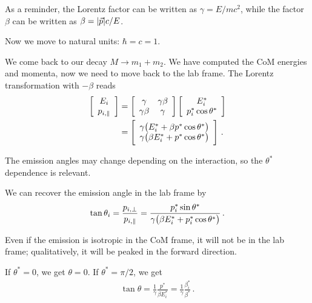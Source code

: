 \documentclass[main.tex]{subfiles}
\begin{document}

As a reminder, the Lorentz factor can be written as \(\gamma = E / mc^2\), while the  
factor \(\beta \) can be written as \(\beta = \abs{\vec{p}} c / E\). 

Now we move to natural units: \(\hbar = c = 1\). 

We come back to our decay \(M \to m_1 + m_2 \). 
We have computed the CoM energies and momenta, now we need
to move back to the lab frame. 
The Lorentz transformation with \(- \beta \) reads 
%
\begin{align}
\left[\begin{array}{c}
E_i \\ 
p_{i, \parallel}
\end{array}\right]
&= \left[\begin{array}{cc}
\gamma  & \gamma \beta  \\ 
\gamma \beta  &  \gamma 
\end{array}\right] 
\left[\begin{array}{c}
E_{i}^{*} \\ 
p_{i}^{*} \cos \theta^{*}
\end{array}\right]  \\
&= 
\left[\begin{array}{c}
\gamma \qty(E_i^{*} + \beta p^{*} \cos \theta^{*}) \\ 
\gamma \qty(\beta E_i^{*} + p^{*} \cos \theta^{*})
\end{array}\right]
\,.
\end{align}

The emission angles may change depending on the interaction, so the \(\theta^{*}\) dependence is relevant. 

We can recover the emission angle in the lab frame by 
%
\begin{align}
\tan \theta_i = \frac{p_{i, \perp}}{p_{i, \parallel}}
= \frac{p_i^{*} \sin \theta^{*}}{\gamma \qty(\beta E_i^{*} + p_i^{*} \cos \theta^{*})}
\,.
\end{align}

Even if the emission is isotropic in the CoM frame, it will not be in the lab frame; qualitatively, it will be peaked in the forward direction. 

If \(\theta^{*} = 0\), we get \(\theta = 0\).
If \(\theta^{*}= \pi /2\), we get 
%
\begin{align}
\tan \theta = \frac{1}{\gamma } \frac{p^{*}}{\beta E_i^{*}}
= \frac{1}{\gamma } \frac{\beta^{*}_i}{\beta^{*}}
\,.
\end{align}
\end{document}
